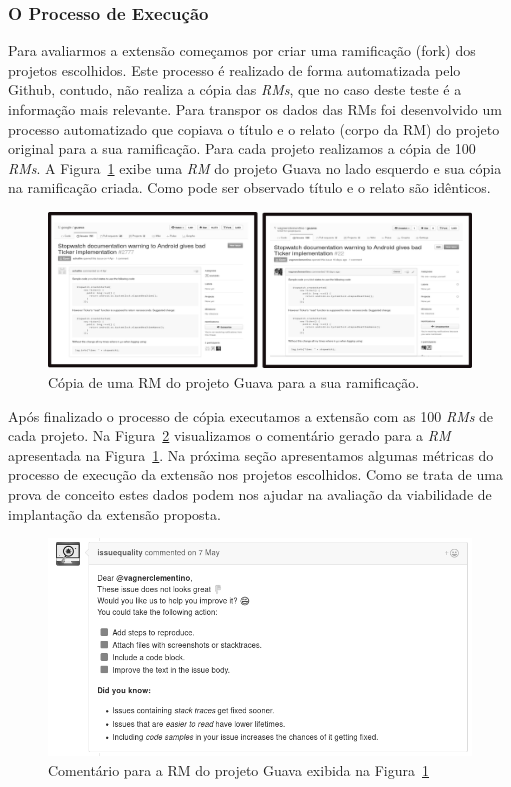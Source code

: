 \subsubsection{O Processo de Execução}
\label{sub:implementacao_processo_execucao}

Para avaliarmos a extensão começamos por criar uma ramificação (fork) dos
projetos escolhidos. Este processo é realizado de forma automatizada pelo
Github, contudo, não realiza a cópia das \textit{RMs}, que no caso deste teste é
a informação mais relevante. Para transpor os dados das RMs foi desenvolvido um
processo automatizado que copiava o título e o relato (corpo da RM) do projeto
original para a sua ramificação. Para cada projeto realizamos a cópia de 100
\textit{RMs}. A Figura~\ref{fig:copia-de-issues} exibe uma \textit{RM} do
projeto Guava no lado esquerdo e sua cópia na ramificação criada. Como pode ser
observado título e o relato são idênticos.

\begin{figure}[htpb]
    \centering
    \includegraphics[width=1.1\linewidth]{chapter-implementacao-extensoes-fgrm/img/copia-de-issues.png}
    \caption{Cópia de uma RM do projeto Guava para a sua ramificação.}
\label{fig:copia-de-issues}
\end{figure}

Após finalizado o processo de cópia executamos a extensão com as 100
\textit{RMs} de cada projeto. Na Figura~\ref{fig:exemplo_comentario_issue}
visualizamos o comentário gerado para a \textit{RM} apresentada na
Figura~\ref{fig:copia-de-issues}. Na próxima seção apresentamos algumas métricas
do processo de execução da extensão nos projetos escolhidos. Como se trata de
uma prova de conceito estes dados podem nos ajudar na avaliação da viabilidade
de implantação da extensão proposta.

\begin{figure}[htpb]
    \centering
    \includegraphics[width=0.7\linewidth]{chapter-implementacao-extensoes-fgrm/img/exemplo_comentario_issue.png}
    \caption{Comentário para a RM do projeto Guava exibida na Figura~\ref{fig:copia-de-issues}}
\label{fig:exemplo_comentario_issue}
\end{figure}

